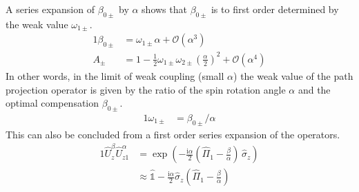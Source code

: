\documentclass[english,keywords,aps,twocolumn]{revtex4-1}
\newcommand{\im}{\text{i}}
\begin{document}
A series expansion of $\beta_{0\pm}$ by $\alpha$ shows that $\beta_{0\pm}$ is to first order determined by the weak value $\omega_{1\pm}$.
\begin{alignat}{1}
 \beta_{0\pm} &=  \omega_{1\pm} \alpha 
 + \mathcal{O}( \alpha^3)
 \label{eq:beta0pmSeries}\\
 A_\pm &= 1-\frac 1 2 \omega_{1\pm} \omega_{2\pm} \left(\frac\alpha 2\right)^2 + \mathcal{O}( \alpha^4)  \label{eq:ApmSeries}
\end{alignat}
In other words, in the limit of weak coupling (small $\alpha$) the weak value of the path projection operator is given by the ratio of the spin rotation angle $\alpha$ and the optimal compensation $\beta_{0\pm}$.
\begin{alignat}{1}
 \omega_{1\pm} &= \beta_{0\pm} /  \alpha
\end{alignat}
This can also be concluded from a first order series expansion of the operators.
\begin{alignat}{1}
  \hat U_z^\beta \hat U_{z1}^\alpha &=  \exp \left(-\frac {\im\alpha} 2 \left( \hat \Pi_1 - \frac \beta \alpha  \right) \, \hat \sigma_z \right)\nonumber  \\ &\approx
\hat{\mathbb 1} - \frac {\im \alpha} 2 \hat \sigma_z \left( \hat \Pi_1 - \frac \beta \alpha \right)
\end{alignat}
\end{document}
